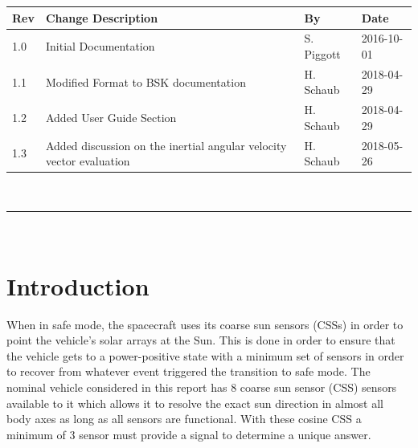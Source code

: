 \documentclass[]{BasiliskReportMemo}
\begin{document}
\makeCover

%
%
\pagestyle{empty}
{\renewcommand{\arraystretch}{2}
\noindent
\begin{longtable}{|p{0.5in}|p{3.5in}|p{1.07in}|p{0.9in}|}
\hline
{\bfseries Rev} & {\bfseries Change Description} & {\bfseries By}& {\bfseries Date} \\
\hline
1.0 & Initial Documentation & S. Piggott & 2016-10-01\\
\hline
1.1 & Modified Format to BSK documentation & H. Schaub & 2018-04-29\\
\hline
1.2 & Added User Guide Section & H. Schaub & 2018-04-29\\
\hline
1.3 & Added discussion on the inertial angular velocity vector evaluation & H. Schaub & 2018-05-26\\
\hline

\end{longtable}
}



\newpage
\setcounter{page}{1}
\pagestyle{fancy}

\tableofcontents %
~\\ \hrule ~\\ %




\section{Introduction}
When in safe mode, the spacecraft uses its coarse sun sensors (CSSs) in order to 
point the vehicle's solar arrays at the Sun.  This is done in order to ensure 
that the vehicle gets to a power-positive state with a minimum set of sensors 
in order to recover from whatever event triggered the transition to safe mode.  
The nominal vehicle considered in this report has 8 coarse sun sensor (CSS) sensors available to it 
which allows it to resolve the exact sun direction in almost all body axes as 
long as all sensors are functional.  With these cosine CSS a minimum of 3 sensor must provide a signal to determine a unique answer.
\end{document}
